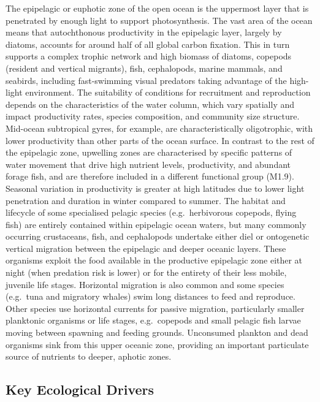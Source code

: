 \documentclass[
  letterpaper,
  DIV=11,
  numbers=noendperiod]{scrartcl}
\begin{document}
The epipelagic or euphotic zone of the open ocean is the uppermost layer
that is penetrated by enough light to support photosynthesis. The vast
area of the ocean means that autochthonous productivity in the
epipelagic layer, largely by diatoms, accounts for around half of all
global carbon fixation. This in turn supports a complex trophic network
and high biomass of diatoms, copepods (resident and vertical migrants),
fish, cephalopods, marine mammals, and seabirds, including fast-swimming
visual predators taking advantage of the high-light environment. The
suitability of conditions for recruitment and reproduction depends on
the characteristics of the water column, which vary spatially and impact
productivity rates, species composition, and community size structure.
Mid-ocean subtropical gyres, for example, are characteristically
oligotrophic, with lower productivity than other parts of the ocean
surface. In contrast to the rest of the epipelagic zone, upwelling zones
are characterised by specific patterns of water movement that drive high
nutrient levels, productivity, and abundant forage fish, and are
therefore included in a different functional group (M1.9). Seasonal
variation in productivity is greater at high latitudes due to lower
light penetration and duration in winter compared to summer. The habitat
and lifecycle of some specialised pelagic species (e.g.~herbivorous
copepods, flying fish) are entirely contained within epipelagic ocean
waters, but many commonly occurring crustaceans, fish, and cephalopods
undertake either diel or ontogenetic vertical migration between the
epipelagic and deeper oceanic layers. These organisms exploit the food
available in the productive epipelagic zone either at night (when
predation risk is lower) or for the entirety of their less mobile,
juvenile life stages. Horizontal migration is also common and some
species (e.g.~tuna and migratory whales) swim long distances to feed and
reproduce. Other species use horizontal currents for passive migration,
particularly smaller planktonic organisms or life stages, e.g.~copepods
and small pelagic fish larvae moving between spawning and feeding
grounds. Unconsumed plankton and dead organisms sink from this upper
oceanic zone, providing an important particulate source of nutrients to
deeper, aphotic zones.

\subsection{Key Ecological Drivers}\label{key-ecological-drivers-35}
\end{document}
